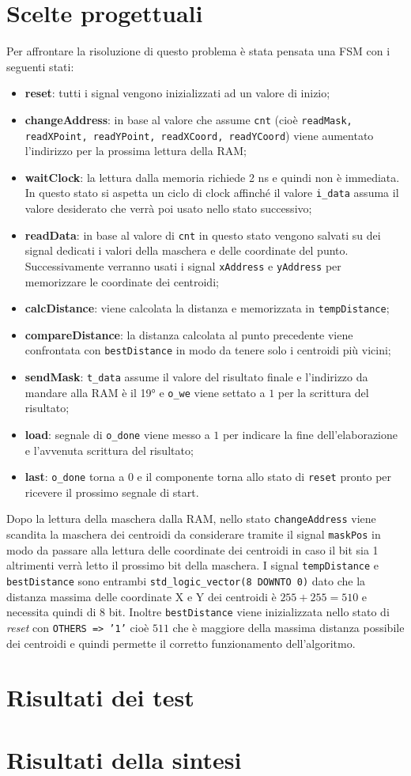 \documentclass{article}
\begin{document}
\section{Scelte progettuali}
Per affrontare la risoluzione di questo problema \`{e} stata pensata una FSM con i seguenti stati: 
\begin{itemize}
	\item \textbf{reset}: tutti i signal vengono inizializzati ad un valore di inizio;
	\item \textbf{changeAddress}: in base al valore che assume \texttt{cnt} (cio\`{e} \texttt{readMask, readXPoint, readYPoint, readXCoord, readYCoord}) viene aumentato l'indirizzo per la prossima lettura della RAM;
	\item \textbf{waitClock}: la lettura dalla memoria richiede 2 ns e quindi non \`{e} immediata. In questo stato si aspetta un ciclo di clock affinch\'{e} il valore \texttt{i\_data} assuma il valore desiderato che verr\`{a} poi usato nello stato successivo;
	\item \textbf{readData}: in base al valore di \texttt{cnt} in questo stato vengono salvati su dei signal dedicati i valori della maschera e delle coordinate del punto. Successivamente verranno usati i signal \texttt{xAddress} e \texttt{yAddress} per memorizzare le coordinate dei centroidi;
	\item \textbf{calcDistance}: viene calcolata la distanza e memorizzata in \texttt{tempDistance};
	\item \textbf{compareDistance}: la distanza calcolata al punto precedente viene confrontata con \texttt{bestDistance} in modo da tenere solo i centroidi pi\`{u} vicini;
	\item \textbf{sendMask}: \texttt{t\_data} assume il valore del risultato finale e l'indirizzo da mandare alla RAM è il 19° e \texttt{o\_we} viene settato a $1$ per la scrittura del risultato;
	\item \textbf{load}: segnale di \texttt{o\_done} viene messo a $1$ per indicare la fine dell'elaborazione e l'avvenuta scrittura del risultato;
	\item \textbf{last}: \texttt{o\_done} torna a $0$ e il componente torna allo stato di \texttt{reset} pronto per ricevere il prossimo segnale di start.
	
\end{itemize}
Dopo la lettura della maschera dalla RAM, nello stato \texttt{changeAddress} viene scandita la maschera dei centroidi da considerare tramite il signal \texttt{maskPos} in modo da passare alla lettura delle coordinate dei centroidi in caso il bit sia 1 altrimenti verr\`{a} letto il prossimo bit della maschera.
\newline
I signal \texttt{tempDistance} e \texttt{bestDistance} sono entrambi \texttt{std\_logic\_vector(8 DOWNTO 0)} dato che la distanza massima delle coordinate X e Y dei centroidi \`{e} $255+255=510$ e necessita quindi di 8 bit. Inoltre \texttt{bestDistance} viene inizializzata nello stato di \textit{reset} con \texttt{OTHERS => '1'} cio\`{e} $511$ che \`{e} maggiore della massima distanza possibile dei centroidi e quindi permette il corretto funzionamento dell'algoritmo.


\section{Risultati dei test}
\section{Risultati della sintesi}
\end{document}
